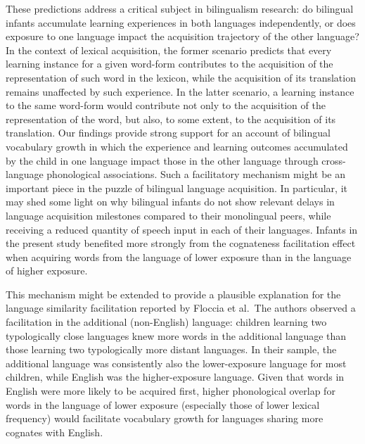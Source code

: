 \documentclass[
]{article}
\begin{document}
These predictions address a critical subject in bilingualism research:
do bilingual infants accumulate learning experiences in both languages
independently, or does exposure to one language impact the acquisition
trajectory of the other language? In the context of lexical acquisition,
the former scenario predicts that every learning instance for a given
word-form contributes to the acquisition of the representation of such
word in the lexicon, while the acquisition of its translation remains
unaffected by such experience. In the latter scenario, a learning
instance to the same word-form would contribute not only to the
acquisition of the representation of the word, but also, to some extent,
to the acquisition of its translation. Our findings provide strong
support for an account of bilingual vocabulary growth in which the
experience and learning outcomes accumulated by the child in one
language impact those in the other language through cross-language
phonological associations. Such a facilitatory mechanism might be an
important piece in the puzzle of bilingual language acquisition. In
particular, it may shed some light on why bilingual infants do not show
relevant delays in language acquisition milestones compared to their
monolingual peers, while receiving a reduced quantity of speech input in
each of their languages. Infants in the present study benefited more
strongly from the cognateness facilitation effect when acquiring words
from the language of lower exposure than in the language of higher
exposure.

This mechanism might be extended to provide a plausible explanation for
the language similarity facilitation reported by Floccia et al.~The
authors observed a facilitation in the additional (non-English)
language: children learning two typologically close languages knew more
words in the additional language than those learning two typologically
more distant languages. In their sample, the additional language was
consistently also the lower-exposure language for most children, while
English was the higher-exposure language. Given that words in English
were more likely to be acquired first, higher phonological overlap for
words in the language of lower exposure (especially those of lower
lexical frequency) would facilitate vocabulary growth for languages
sharing more cognates with English.
\end{document}
